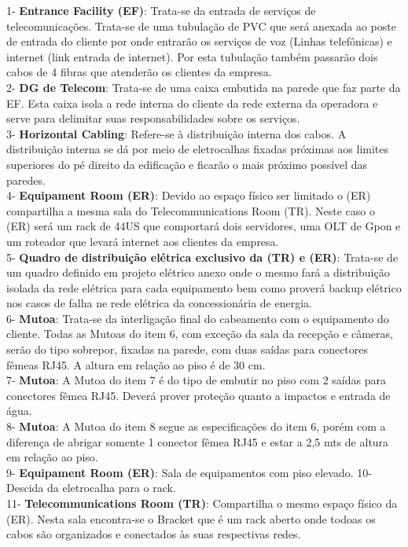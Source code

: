 \documentclass[	DIV=calc,%
							paper=a4,%
							fontsize=12pt,%
							onecolumn]{scrartcl}	 					%
\begin{document}
1- \textbf{Entrance Facility (EF)}: Trata-se da entrada de serviços de telecomunicações. Trata-se de uma tubulação de PVC que será anexada ao poste de entrada do cliente por onde entrarão os serviços de voz (Linhas telefônicas) e internet (link entrada de internet). Por esta tubulação também passarão dois cabos de 4 fibras que atenderão os clientes da empresa.\\
2- \textbf{DG de Telecom}: Trata-se de uma caixa embutida na parede que faz parte da EF. Esta caixa isola a rede interna do cliente da rede externa da operadora e serve para delimitar suas responsabilidades sobre os serviços.\\
3- \textbf{Horizontal Cabling}: Refere-se à distribuição interna dos cabos. A distribuição interna se dá por meio de eletrocalhas fixadas próximas aos limites superiores do pé direito da edificação e ficarão o mais próximo possível das paredes.\\ 
4- \textbf{Equipament Room (ER)}: Devido ao espaço físico ser limitado o (ER) compartilha a mesma sala do Telecommunications Room (TR). Neste caso o (ER) será um rack de 44US que comportará dois servidores, uma OLT de Gpon e um roteador que levará internet aos clientes da empresa.\\
5- \textbf{Quadro de distribuição elétrica exclusivo da (TR) e (ER)}: Trata-se de um quadro definido em projeto elétrico anexo onde o mesmo fará a distribuição isolada da rede elétrica para cada equipamento bem como proverá backup elétrico nos casos de falha ne rede elétrica da concessionária de energia.\\
6- \textbf{Mutoa}: Trata-se da interligação final do cabeamento com o equipamento do cliente. Todas as Mutoas do item 6, com exceção da sala da recepção e câmeras, serão do tipo sobrepor, fixadas na parede, com duas saídas para conectores fêmeas RJ45. A altura em relação ao piso é de 30 cm.\\
7- \textbf{Mutoa}: A Mutoa do item 7 é do tipo de embutir no piso com 2 saídas para conectores fêmea RJ45. Deverá prover proteção quanto a impactos e entrada de água.\\
8- \textbf{Mutoa}: A Mutoa do item 8 segue as especificações do item 6, porém com a diferença de abrigar somente 1 conector fêmea RJ45 e estar a 2,5 mts de altura em relação ao piso.\\
9- \textbf{Equipament Room (ER)}: Sala de equipamentos com piso elevado.
10- Descida da eletrocalha para o rack.\\
11- \textbf{Telecommunications Room (TR)}: Compartilha o mesmo espaço físico da (ER). Nesta sala encontra-se o Bracket que é um rack aberto onde todoas os cabos são organizados e conectados às suas respectivas redes.\\
\end{document}
